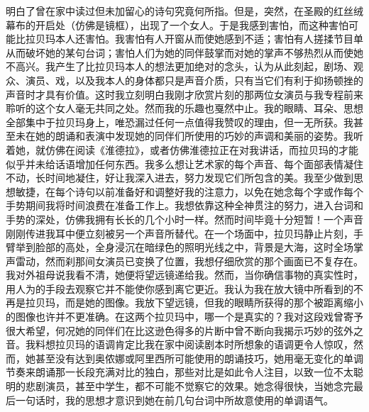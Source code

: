 明白了曾在家中读过但未加留心的诗句究竟何所指。但是，突然，在圣殿的红丝绒幕布的开启处（仿佛是镜框），出现了一个女人。于是我感到害怕，而这种害怕可能比拉贝玛本人还害怕。我害怕有人开窗从而使她感到不适；害怕有人搓揉节目单从而破坏她的某句台词；害怕人们为她的同伴鼓掌而对她的掌声不够热烈从而使她不高兴。我产生了比拉贝玛本人的想法更加绝对的念头，认为从此刻起，剧场、观众、演员、戏，以及我本人的身体都只是声音介质，只有当它们有利于抑扬顿挫的声音时才具有价值。这时我立刻明白我刚才欣赏片刻的那两位女演员与我专程前来聆听的这个女人毫无共同之处。然而我的乐趣也戛然中止。我的眼睛、耳朵、思想全部集中于拉贝玛身上，唯恐漏过任何一点值得我赞叹的理由，但一无所获。我甚至未在她的朗诵和表演中发现她的同伴们所使用的巧妙的声调和美丽的姿势。我听着她，就仿佛在阅读《淮德拉》，或者仿佛淮德拉正在对我讲话，而拉贝玛的才能似乎并未给话语增加任何东西。我多么想让艺术家的每个声音、每个面部表情凝住不动，长时间地凝住，好让我深入进去，努力发现它们所包含的美。我至少做到思想敏捷，在每个诗句以前准备好和调整好我的注意力，以免在她念每个字或作每个手势期间我将时间浪费在准备工作上。我想依靠这种全神贯注的努力，进入台词和手势的深处，仿佛我拥有长长的几个小时一样。然而时间毕竟十分短暂！一个声音刚刚传进我耳中便立刻被另一个声音所替代。在一个场面中，拉贝玛静止片刻，手臂举到脸部的高处，全身浸沉在暗绿色的照明光线之中，背景是大海，这时全场掌声雷动，然而刹那间女演员已变换了位置，我想仔细欣赏的那个画面已不复存在。我对外祖母说我看不清，她便将望远镜递给我。然而，当你确信事物的真实性时，用人为的手段去观察它并不能使你感到离它更近。我认为我在放大镜中所看到的不再是拉贝玛，而是她的图像。我放下望远镜，但我的眼睛所获得的那个被距离缩小的图像也许并不更准确。在这两个拉贝玛中，哪一个是真实的？我对这段戏曾寄予很大希望，何况她的同伴们在比这逊色得多的片断中曾不断向我揭示巧妙的弦外之音。我料想拉贝玛的语调肯定比我在家中阅读剧本时所想象的语调更令人惊叹，然而，她甚至没有达到奥侬娜或阿里西所可能使用的朗诵技巧，她用毫无变化的单调节奏来朗诵那一长段充满对比的独白，那些对比是如此令人注目，以致一位不太聪明的悲剧演员，甚至中学生，都不可能不觉察它的效果。她念得很快，当她念完最后一句话时，我的思想才意识到她在前几句台词中所故意使用的单调语气。
